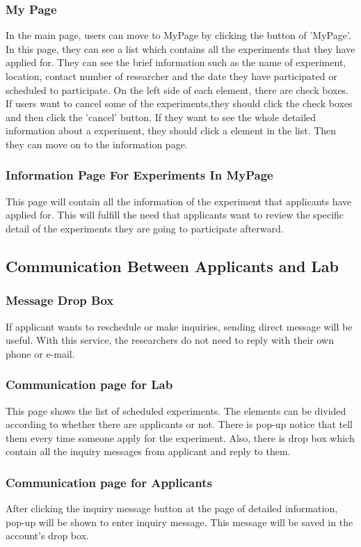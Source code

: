 \documentclass[letterpaper, 10 pt, conference]{ieeeconf}  %
\begin{document}
\subsubsection{My Page}
In the main page, users can move to MyPage by clicking the button of 'MyPage'. In this page, they can see a list which contains all the experiments that they have applied for. They can see the brief information such as the name of experiment, location, contact number of researcher and the date they have participated or scheduled to participate. On the left side of each element, there are check boxes. If users want to cancel some of the experiments,they should click the check boxes and then click the 'cancel' button. If they want to see the whole detailed information about a experiment, they should click a element in the list. Then they can move on to the information page.
\subsubsection{Information Page For Experiments In MyPage}
This page will contain all the information of the experiment that applicants have applied for. This will fulfill the need that applicants want to review the specific detail of the experiments they are going to participate afterward.

\subsection{Communication Between Applicants and Lab}
\subsubsection{Message Drop Box}
If applicant wants to reschedule or make inquiries, sending direct message will be useful. With this service, the researchers do not need to reply with their own phone or e-mail. 
\subsubsection{Communication page for Lab}
This page shows the list of scheduled experiments. The elements can be divided according to whether there are applicants or not. There is pop-up notice that tell them every time someone apply for the experiment. Also, there is drop box which contain all the inquiry messages from applicant and reply to them. 
\subsubsection{Communication page for Applicants}
After clicking the inquiry message button at the page of detailed information, pop-up will be shown to enter inquiry message. This message will be saved in the account's drop box. 
\end{document}
